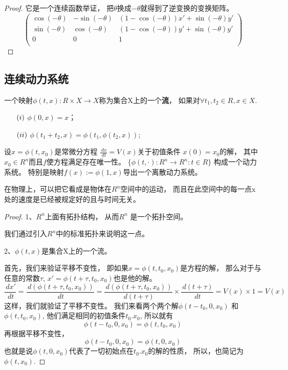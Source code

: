 \begin{defination}[离散动力系统]
\begin{proof}
它是一个连续函数举证，
把\(\theta\)换成\(-\theta\)就得到了逆变换的变换矩阵。
\[\left(
  \begin{array}{ccc}
    \cos (-\theta) & -\sin (-\theta) & (1-\cos(-\theta))x'+\sin(-\theta) y' \\
    \sin (-\theta) & \cos (-\theta)  & (1-\cos(-\theta))y'+\sin(-\theta) y' \\
    0 & 0 & 1\\
  \end{array}
\right)
\]

\end{proof}


\subsection{连续动力系统}

\begin{defination}
一个映射\(\phi(t,x):R\times X \rightarrow X\)称为集合X上的一个\textbf{流}，
如果对\(\forall t_1,t_2 \in R,x\in X\).
\begin{enumerate}
                        \item [\((\romannumeral 1)\)]  \(\phi(0,x)=x\)；
                        \item [\((\romannumeral 2)\)]  \(\phi(t_1+t_2,x)=\phi(t_1,\phi(t_2,x))\);
                \end{enumerate}
\end{defination}


设\(x=\phi(t,x_0)\)是常微分方程
\(\frac{\,dx}{\,dt}=V(x)\)关于初值条件
\(x(0)=x_0\)的解，
其中\(x_0\in R^n\)而且\(f\)使方程满足存在唯一性。
\(\{\phi(t,\cdot):R^n \rightarrow R^n:t\in R\}\) 构成一个动力系统。
特别是映射\(f(x):=\phi(1,x)\)导出一个离散动力系统。


在物理上，可以把它看成是物体在\(R^n\)空间中的运动，
而且在此空间中的每一点x处的速度是已经被规定好的且与时间无关。
\begin{proof}
1、\(R^n\)上面有拓扑结构，
从而\(R^n\) 是一个拓扑空间。

我们通过引入\(R^n\)中的标准拓扑来说明这一点。

2、\(\phi(t,x)\)是集合X上的一个流。

首先，我们来验证平移不变性，
即如果\(x=\phi(t,t_0,x_0)\)是方程的解，
那么对于与任意的常数\(\tau\),
\(x'=\phi(t+\tau,t_0,x_0)\)也是他的解。
\[\frac{\,dx'}{\,dt}
=\frac{\,d(\phi(t+\tau,t_0,x_0))}{\,dt}
=\frac{\,d(\phi(t+\tau,t_0,x_0))}{\,d(t+\tau)}\times \frac{\,d(t+\tau)}{\,dt}
=V(x)\times 1
=V(x)\]
这样，我们就验证了平移不变性。
我们来看两个两个解\(\phi(t-t_0,0,x_0)\) 和\(\phi(t,t_0,x_0)\),
他们满足相同的初值条件\(t_0.x_0\), 所以就有
\[\phi(t-t_0,0,x_0)=\phi(t,t_0,x_0)\]
再根据平移不变性，
\[\phi(t-t_0,0,x_0)=\phi(t,0,x_0)\]
也就是说\(\phi(t,0,x_0)\)代表了一切初始点在\(t_0.x_0\)的解的性质，
所以，也简记为\(\phi(t,x_0)\).


\end{proof}
\end{defination}
